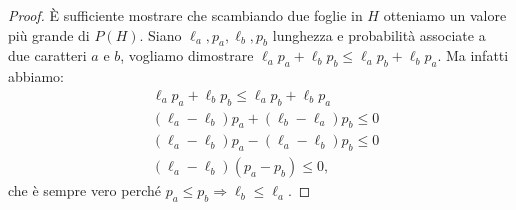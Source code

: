\begin{proof}
  È sufficiente mostrare che scambiando due foglie in \(H\) otteniamo un valore
  più grande di \(P(H)\). Siano \(\ell_a, p_a, \ell_b, p_b\) lunghezza e
  probabilità associate a due caratteri \(a\) e \(b\), vogliamo dimostrare 
  \(\ell_a p_a + \ell_b p_b \le \ell_a p_b + \ell_b p_a\). Ma infatti abbiamo:
  \begin{align*}
    & \ell_a p_a + \ell_b p_b \le \ell_a p_b + \ell_b p_a \\
    & (\ell_a - \ell_b) p_a + (\ell_b - \ell_a) p_b \le 0 \\
    & (\ell_a - \ell_b) p_a - (\ell_a - \ell_b) p_b \le 0 \\
    & (\ell_a - \ell_b)(p_a - p_b) \le 0\text{,}
  \end{align*}
  che è sempre vero perché \(p_a \le p_b \Rightarrow \ell_b \le \ell_a\).
\end{proof}
